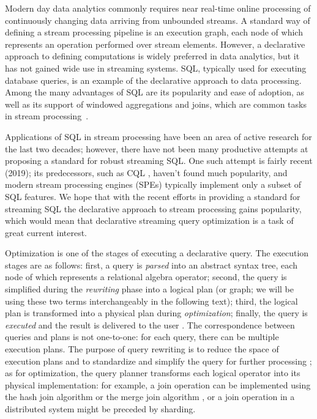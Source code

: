 \label {fs-optimization-introduction}

Modern day data analytics commonly requires near real-time online processing of continuously changing data arriving from unbounded streams. A standard way of defining a stream processing pipeline is an execution graph, each node of which represents an operation performed over stream elements. However, a declarative approach to defining computations is widely preferred in data analytics, but it has not gained wide use in streaming systems. SQL, typically used for executing database queries, is an example of the declarative approach to data processing. Among the many advantages of SQL are its popularity and ease of adoption, as well as its support of windowed aggregations and joins, which are common tasks in stream processing~\cite{carbone2018scalable}. 

Applications of SQL in stream processing have been an area of active research for the last two decades; however, there have not been many productive attempts at proposing a standard for robust streaming SQL. One such attempt \cite{Begoli:2019:OSR:3299869.3314040} is fairly recent (2019); its predecessors, such as CQL \cite{Arasu:2006:CCQ:1146461.1146463}, haven't found much popularity, and modern stream processing engines (SPEs) typically implement only a subset of SQL features. We hope that with the recent efforts in providing a standard for streaming SQL the declarative approach to stream processing gains popularity, which would mean that declarative streaming query optimization is a task of great current interest.

Optimization is one of the stages of executing a declarative query. The execution stages are as follows: first, a query is \textit{parsed} into an abstract syntax tree, each node of which represents a relational algebra operator; second, the query is simplified during the \textit{rewriting} phase into a logical plan (or graph; we will be using these two terms interchangeably in the following text); third, the logical plan is transformed into a physical plan during \textit{optimization}; finally, the query is \textit{executed} and the result is delivered to the user \cite{Pitoura2018processing}. The correspondence between queries and plans is not one-to-one: for each query, there can be multiple execution plans. The purpose of query rewriting is to reduce the space of execution plans and to standardize and simplify the query for further processing \cite{Pitoura2018rewriting}; as for optimization, the query planner transforms each logical operator into its physical implementation: for example, a join operation can be implemented using the hash join algorithm or the merge join algorithm \cite{Neumann2018optimization}, or a join operation in a distributed system might be preceded by sharding.  

